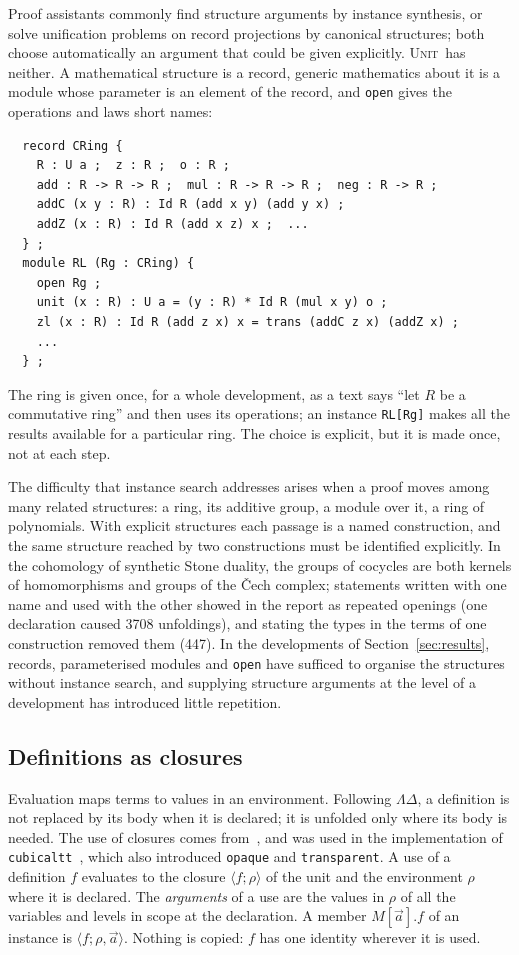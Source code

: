 \documentclass[11pt]{article}
\newcommand{\sys}{\textsc{Unit}}
\newcommand{\kw}[1]{\texttt{#1}}
\begin{document}
Proof assistants commonly find structure arguments by instance
synthesis, or solve unification problems on record projections by
canonical structures; both choose automatically an argument that could
be given explicitly.
\sys\ has neither. A mathematical structure is a record, generic
mathematics about it is a module whose parameter is an element of the
record, and \kw{open} gives the operations and laws short names:
\begin{verbatim}
  record CRing {
    R : U a ;  z : R ;  o : R ;
    add : R -> R -> R ;  mul : R -> R -> R ;  neg : R -> R ;
    addC (x y : R) : Id R (add x y) (add y x) ;
    addZ (x : R) : Id R (add x z) x ;  ...
  } ;
  module RL (Rg : CRing) {
    open Rg ;
    unit (x : R) : U a = (y : R) * Id R (mul x y) o ;
    zl (x : R) : Id R (add z x) x = trans (addC z x) (addZ x) ;
    ...
  } ;
\end{verbatim}
The ring is given once, for a whole development, as a text says ``let
$R$ be a commutative ring'' and then uses its operations; an instance
\kw{RL[Rg]} makes all the results available for a particular ring. The
choice is explicit, but it is made once, not at each step.

The difficulty that instance search addresses arises when a proof moves
among many related structures: a ring, its additive group, a module over
it, a ring of polynomials. With explicit structures each passage is a
named construction, and the same structure reached by two constructions
must be identified explicitly. In the cohomology of synthetic Stone
duality, the groups of cocycles are both kernels of homomorphisms and
groups of the \v{C}ech complex; statements written with one name and
used with the other showed in the report as repeated openings (one
declaration caused 3708 unfoldings), and stating the types in the
terms of one construction removed them (447). In the developments of
Section~\ref{sec:results}, records, parameterised modules and \kw{open}
have sufficed to organise the structures without instance search, and
supplying structure arguments at the level of a development has
introduced little repetition.

\subsection{Definitions as closures}

Evaluation maps terms to values in an environment. Following
$\Lambda\Delta$, a definition is not replaced by its body when it is
declared; it is unfolded only where its body is needed. The use of
closures comes from~\cite{C96,Wang}, and was used in the implementation
of \texttt{cubicaltt}~\cite{cubicaltt}, which also introduced
\kw{opaque} and \kw{transparent}. A use of a definition $f$ evaluates
to the closure $\langle f;\rho\rangle$ of the unit and the environment
$\rho$ where it is declared. The \emph{arguments} of a use are the values
in $\rho$ of all the variables and levels in scope at the declaration. A
member $M[\vec a].f$ of an instance is $\langle f;\rho,\vec a\rangle$.
Nothing is copied: $f$ has one identity wherever it is used.
\end{document}
